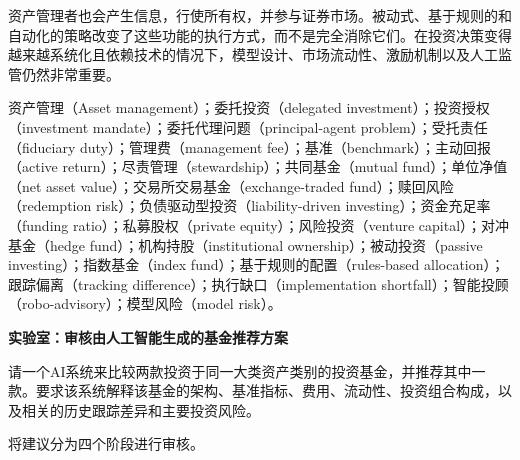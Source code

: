 资产管理者也会产生信息，行使所有权，并参与证券市场。被动式、基于规则的和自动化的策略改变了这些功能的执行方式，而不是完全消除它们。在投资决策变得越来越系统化且依赖技术的情况下，模型设计、市场流动性、激励机制以及人工监管仍然非常重要。



资产管理（Asset management）；委托投资（delegated investment）；投资授权（investment mandate）；委托代理问题（principal-agent problem）；受托责任（fiduciary duty）；管理费（management fee）；基准（benchmark）；主动回报（active return）；尽责管理（stewardship）；共同基金（mutual fund）；单位净值（net asset value）；交易所交易基金（exchange-traded fund）；赎回风险（redemption risk）；负债驱动型投资（liability-driven investing）；资金充足率（funding ratio）；私募股权（private equity）；风险投资（venture capital）；对冲基金（hedge fund）；机构持股（institutional ownership）；被动投资（passive investing）；指数基金（index fund）；基于规则的配置（rules-based allocation）；跟踪偏离（tracking difference）；执行缺口（implementation shortfall）；智能投顾（robo-advisory）；模型风险（model risk）。



\textbf{实验室：审核由人工智能生成的基金推荐方案}

请一个AI系统来比较两款投资于同一大类资产类别的投资基金，并推荐其中一款。要求该系统解释该基金的架构、基准指标、费用、流动性、投资组合构成，以及相关的历史跟踪差异和主要投资风险。

将建议分为四个阶段进行审核。

